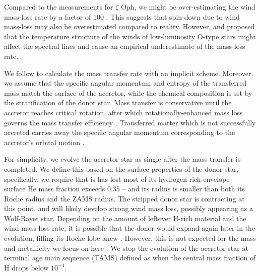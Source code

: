 \documentclass[twocolumn,twocolappendix,trackchanges]{aastex63}
\newcommand{\zoph}{$\zeta$ Oph}
\begin{document}
Compared to the measurements for
\zoph, we might be over-estimating the wind mass-loss rate by a factor
of 100 \citep[``weak wind problem'', see][]{marcolino:09}. This
suggests that spin-down due to wind mass-loss may also be
overestimated compared to reality. However, \cite{lucy:12} and
\cite{lagae:21} proposed that the temperature structure of the winds
of low-luminosity O-type stars might affect the spectral lines and
cause an empirical underestimate of the mass-loss rate.

We follow \cite{kolb:90} to calculate the mass transfer rate with an
implicit scheme. Moreover, we assume that the specific angular
momentum and entropy of the transferred mass match the surface of the
accretor, while the chemical composition is set by the stratification
of the donor star. Mass transfer is conservative until the accretor
reaches critical rotation, after which rotationally-enhanced mass loss
governs the mass transfer efficiency \citep[e.g.,][]{petrovic:05}.
Transferred matter which is not successfully accreted carries away the
specific angular momentum corresponding to the accretor's orbital
motion \citep[e.g.,][]{soberman:97, vandenheuvel:17}.


For simplicity, we evolve the accretor star as single after the mass
transfer is completed. We define this based on the surface properties
of the donor star, specifically, we require that is has lost most of
its hydrogen-rich envelope -- surface He mass fraction exceeds 0.35 --
and its radius is smaller than both its Roche radius and the ZAMS
radius. The stripped donor star is contracting at this point, and
will likely develop strong wind mass loss, possibly appearing as a
Wolf-Rayet star. Depending on the amount of leftover H-rich material
and the wind mass-loss rate, it is possible that the donor would
expand again later in the evolution, filling its Roche lobe anew
\citep[cf.,][]{gilkis:19}. However, this is not expected for the mass
and metallicity we focus on here \citep[e.g.,][]{laplace:20}. We stop the evolution
of the accretor star at terminal age main sequence (TAMS) defined as
when the central mass fraction of H drops below $10^{-4}$.
\end{document}
